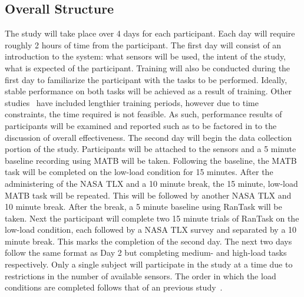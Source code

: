 \documentclass[11pt]{article}
\begin{document}
\subsection{Overall Structure}
The study will take place over 4 days for each participant. Each day will require roughly 2 hours of time from the participant. The first day will consist of an introduction to the system: what sensors will be used, the intent of the study, what is expected of the participant. Training will also be conducted during the first day to familiarize the participant with the tasks to be performed. Ideally, stable performance on both tasks will be achieved as a result of training. Other studies~\cite{Wilson} have included lengthier training periods, however due to time constraints, the time required is not feasible. As such, performance results of participants will be examined and reported such as to be factored in to the discussion of overall effectiveness. The second day will begin the data collection portion of the study. Participants will be attached to the sensors and a 5 minute baseline recording using MATB will be taken. Following the baseline, the MATB task will be completed on the low-load condition for 15 minutes. After the administering of the NASA TLX and a 10 minute break, the 15 minute, low-load MATB task will be repeated. This will be followed by another NASA TLX and 10 minute break. After the break, a 5 minute baseline using RanTask will be taken. Next the participant will complete two 15 minute trials of RanTask on the low-load condition, each followed by a NASA TLX survey and separated by a 10 minute break. This marks the completion of the second day. The next two days follow the same format as Day 2 but completing medium- and high-load tasks respectively. Only a single subject will participate in the study at a time due to restrictions in the number of available sensors. The order in which the load conditions are completed follows that of an previous study~\cite{Wilson}.

\end{document}
